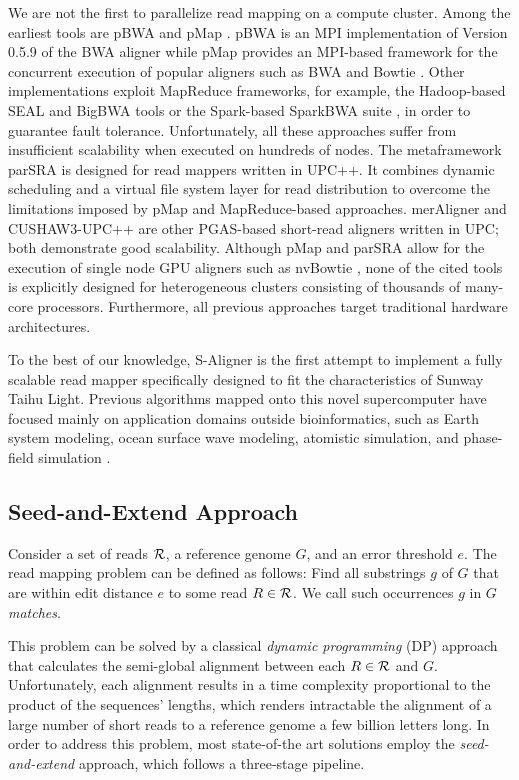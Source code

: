 \documentclass[conference]{IEEEtran}
\begin{document}
We are not the first to parallelize read mapping on a compute
cluster. Among the earliest tools are pBWA \cite{pbwa} and pMap
\cite{pmap}. pBWA is an MPI implementation of Version 0.5.9 of the BWA
aligner while pMap provides an MPI-based framework for the concurrent
execution of popular aligners such as BWA \cite{bwa} and Bowtie
\cite{bowtie}. Other implementations exploit MapReduce frameworks, for
example, the Hadoop-based SEAL \cite{seal} and BigBWA \cite{bigbwa}
tools or the Spark-based SparkBWA suite \cite{sparkBWA}, in order to
guarantee fault tolerance. Unfortunately, all these approaches suffer
from insufficient scalability when executed on hundreds of nodes. The
metaframework parSRA \cite{parSRA} is designed for read mappers
written in UPC++.  It combines dynamic scheduling and a virtual file
system layer for read distribution to overcome the limitations imposed
by pMap and MapReduce-based approaches. merAligner \cite{merAligner}
and CUSHAW3-UPC++ \cite{cushaw3upc} are other PGAS-based short-read
aligners written in UPC; both demonstrate good scalability. Although
pMap and parSRA allow for the execution of single node GPU aligners
such as nvBowtie \cite{nvBio}, none of the cited tools is explicitly
designed for heterogeneous clusters consisting of thousands of
many-core processors. Furthermore, all previous approaches target
traditional hardware architectures.

To the best of our knowledge, S-Aligner is the first attempt to
implement a fully scalable read mapper specifically designed to fit
the characteristics of Sunway Taihu Light. Previous algorithms mapped
onto this novel supercomputer have focused mainly on application
domains outside bioinformatics, such as Earth system modeling, ocean
surface wave modeling, atomistic simulation, and phase-field
simulation \cite{sunway}.

\subsection{Seed-and-Extend Approach}

Consider a set of reads ${\cal R}$, a reference genome $G$, and an
error threshold $e$. The read mapping problem can be defined as
follows: Find all substrings $g$ of $G$ that are within edit distance
$e$ to some read $R \in {\cal R}$. We call such occurrences $g$ in $G$
{\em matches}.

This problem can be solved by a classical {\em dynamic programming}
(DP) approach that calculates the semi-global alignment between each
$R \in {\cal R}$ and $G$. Unfortunately, each alignment results in a
time complexity proportional to the product of the sequences' lengths,
which renders intractable the alignment of a large number of short
reads to a reference genome a few billion letters long.  In order to
address this problem, most state-of-the art solutions \cite{Reinert}
employ the {\em seed-and-extend} approach, which follows a three-stage
pipeline.
\end{document}
